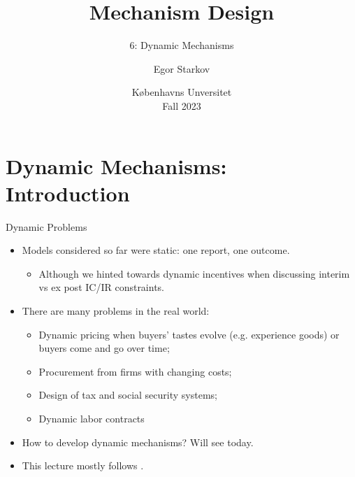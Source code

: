 \documentclass[english,10pt
,aspectratio=169
]{beamer}
\title{Mechanism Design}
\subtitle{6: Dynamic Mechanisms}
\author{Egor Starkov}
\date{K{\o}benhavns Unversitet \\
	Fall 2023}
\begin{document}
	\frame[plain]{\titlepage}


\section{Dynamic Mechanisms: Introduction}

\begin{frame}{Dynamic Problems}
\begin{itemize}
	\item Models considered so far were static: one report, one outcome.
	\begin{itemize}
		\item Although we hinted towards dynamic incentives when discussing interim vs ex post IC/IR constraints.
	\end{itemize}
	\item There are many  problems in the real world:
	\begin{itemize}
		\item Dynamic pricing when buyers' tastes evolve (e.g. experience goods) or buyers come and go over time;
		\item Procurement from firms with changing costs;
		\item Design of tax and social security systems;
		\item Dynamic labor contracts
	\end{itemize}
	\item How to develop dynamic mechanisms? Will see today.
	\item This lecture mostly follows \cite{bergemann_dynamic_2019}.
\end{itemize}
\end{frame}
\end{document}
